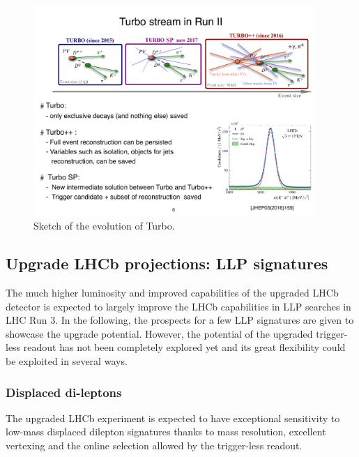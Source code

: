 \begin{figure}[h]
\centerline{\includegraphics[width=0.95\textwidth]{figures/Turbo.pdf}}
  \caption{Sketch of the evolution of Turbo.}
  \label{fig:turbo}
\end{figure}




\subsection{Upgrade LHCb projections: LLP signatures}
\label{sec:ulhcbphys}

The much higher luminosity and improved capabilities of the upgraded LHCb detector is expected to largely improve the LHCb capabilities in LLP searches in LHC Run 3. In the following, the prospects for a few LLP signatures are given to showcase the upgrade potential. However, the potential of the upgraded trigger-less readout has not been completely explored yet and its great flexibility could be exploited in several ways.

\subsubsection{Displaced di-leptons}
The upgraded LHCb experiment is expected to have exceptional sensitivity to low-mass displaced dilepton signatures thanks to mass resolution, excellent vertexing and the online selection allowed by the trigger-less readout.

